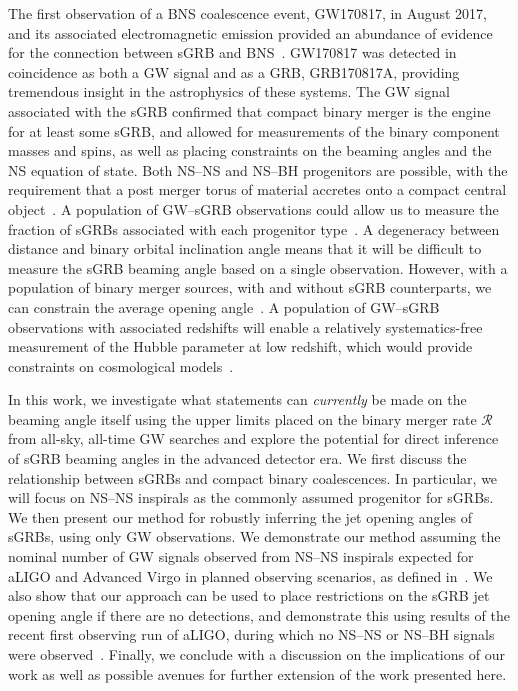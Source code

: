 \documentclass[twocolumn,nofootinbib]{revtex4-1}
\newcommand{\cbcrate}{{{\mathcal R}}}
\newcommand{\BNS}{\ac{NS}--\ac{NS}\xspace}
\newcommand{\NSBH}{\ac{NS}--\ac{BH}\xspace}
\newcommand{\JOINT}{\ac{GW}--\ac{sGRB}\xspace}
\begin{document}
The first observation of a \ac{BNS} coalescence event, GW170817, in
August 2017, and its associated electromagnetic emission provided an
abundance of evidence for the connection between \ac{sGRB} and
\ac{BNS}~\cite{2017ApJ...848L..12A}. GW170817 was detected in coincidence as both a \ac{GW}
signal and as a \ac{GRB}, GRB170817A, providing tremendous insight in
the astrophysics of these systems.  The \ac{GW} signal associated with
the \ac{sGRB} confirmed that compact binary merger is the engine for
at least some \ac{sGRB}, and allowed for measurements of the binary
component masses and spins, as well as placing constraints on the
beaming angles and the \ac{NS} equation of state.  Both \BNS and \NSBH
progenitors are possible, with the requirement that a post merger
torus of material accretes onto a compact central
object~\cite{Blandford:1977ds,Rosswog:2002rt,Giacomazzo:2012zt}.  A
population of \JOINT observations could allow us to measure the
fraction of \acp{sGRB} associated with each progenitor
type~\cite{Kreidberg:2012ud}.  A degeneracy between distance and
binary orbital inclination angle means that it will be difficult to
measure the \ac{sGRB} beaming angle based on a single observation.
However, with a population of binary merger sources, with and without
\ac{sGRB} counterparts, we can constrain the average opening
angle~\cite{Clark:2014jpa}.  A population of \JOINT observations with
associated redshifts will enable a relatively systematics-free
measurement of the Hubble parameter at low redshift, which would
provide constraints on cosmological
models~\cite{Schutz:1986gp,Chen:2012qh}.

In this work, we investigate what statements can \emph{currently} be
made on the beaming angle itself using the upper limits placed on the binary
merger rate $\cbcrate$ from all-sky, all-time \ac{GW} searches and explore the
potential for direct inference of \ac{sGRB} beaming angles in the advanced
detector era.  We first discuss the relationship between \acp{sGRB} and compact
binary coalescences.  In particular, we will focus on \BNS inspirals as the
commonly assumed progenitor for \acp{sGRB}.  We then present our method for
robustly inferring the jet opening angles of \acp{sGRB}, using only \ac{GW}
observations.  We demonstrate our method assuming the nominal number of \ac{GW}
signals observed from \BNS inspirals expected for \ac{aLIGO} and Advanced
Virgo in planned observing scenarios, as defined in~\cite{Aasi:2013wya}.
We also show that our approach can
be used to place restrictions on the \ac{sGRB} jet opening angle if
there are no detections, and demonstrate this using results of the
recent first observing run of \ac{aLIGO}, during which no \BNS or
\NSBH signals were observed~\cite{Abbott:2016ymx}.  Finally, we
conclude with a discussion on the implications of our work as well as
possible avenues for further extension of the work presented here.
\end{document}

